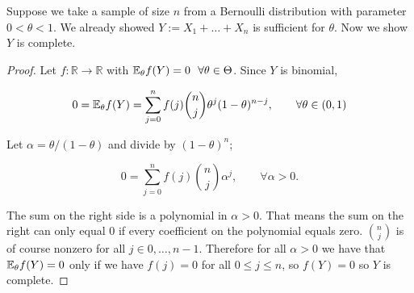 \begin{example} Suppose we take a sample of size \(n\) from a Bernoulli distribution with parameter \(0 < \theta < 1\). We already showed \(Y:= X_1 + \ldots + X_n\) is sufficient for \(\theta\). Now we show \(Y\) is complete. 

\begin{proof}

Let \(f: \mathbb{R} \to \mathbb{R}\) with \(\E_\theta f(Y) = 0 \ \  \forall \theta \in \Theta\). Since \(Y\) is binomial, 

\[
0 = \E_\theta f(Y) = \sum_{j=0}^n f(j) \binom{n}{j} \theta^j (1- \theta)^{n-j}, \qquad \forall \theta \in (0,1)
\]

Let \(\alpha = \theta/(1-\theta)\) and divide by \((1-\theta)^n\);

\[
0 =  \sum_{j=0}^n f(j) \binom{n}{j} \alpha^j, \qquad \forall \alpha > 0.
\]

The sum on the right side is a polynomial in \(\alpha > 0\). That means the sum on the right can only equal 0 if every coefficient on the polynomial equals zero. \(\binom{n}{j}\) is of course nonzero for all \(j \in 0, \ldots, n-1\). Therefore for all \(\alpha > 0\) we have that \(\E_\theta f(Y) = 0\) only if we have \(f(j) = 0\) for all \(0 \leq j  \leq n\), so \(f(Y) = 0\) so \(Y\) is complete.

\end{proof}

\end{example}

